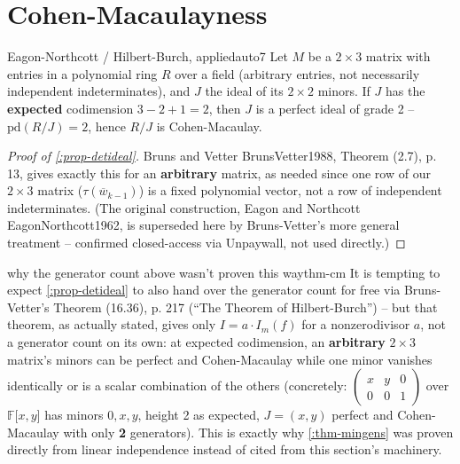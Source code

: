 \documentclass[a4paper,11pt]{scrartcl}
\begin{document}
\section{Cohen-Macaulayness}

\begin{proposition}{Eagon-Northcott / Hilbert-Burch, applied}{auto7} Let \(M\) be a \(2 \times 3\) matrix with entries in a polynomial ring \(R\) over a field (arbitrary entries, not necessarily independent indeterminates), and \(J\) the ideal of its \(2 \times 2\) minors. If \(J\) has the \textbf{expected} codimension \(3 - 2 + 1 = 2\), then \(J\) is a perfect ideal of grade 2 -- \(\text{pd}(R/J) = 2\), hence \(R/J\) is Cohen-Macaulay.

\end{proposition} \protect{}\label{prop-detideal}{}

\begin{proof}[Proof of \cref{:prop-detideal}] Bruns and Vetter BrunsVetter1988, Theorem (2.7), p. 13, gives exactly this for an \textbf{arbitrary} matrix, as needed since one row of our \(2 \times 3\) matrix (\(\tau({\overline{w}}_{k - 1})\)) is a fixed polynomial vector, not a row of independent indeterminates. (The original construction, Eagon and Northcott EagonNorthcott1962, is superseded here by Bruns-Vetter's more general treatment -- confirmed closed-access via Unpaywall, not used directly.)

\end{proof}

\begin{remark}{why the generator count above wasn't proven this way}{thm-cm} It is tempting to expect \cref{:prop-detideal} to also hand over the generator count for free via Bruns-Vetter's Theorem (16.36), p. 217 (``The Theorem of Hilbert-Burch'') -- but that theorem, as actually stated, gives only \(I = a \cdot I_{m}(f)\) for a nonzerodivisor \(a\), not a generator count on its own: at expected codimension, an \textbf{arbitrary} \(2 \times 3\) matrix's minors can be perfect and Cohen-Macaulay while one minor vanishes identically or is a scalar combination of the others (concretely: \(\begin{pmatrix}
x & y & 0 \\
0 & 0 & 1
\end{pmatrix}\) over \(\mathbb{F}\lbrack x,y\rbrack\) has minors \(0,x,y\), height 2 as expected, \(J = (x,y)\) perfect and Cohen-Macaulay with only \textbf{2} generators). This is exactly why \cref{:thm-mingens} was proven directly from linear independence instead of cited from this section's machinery.

\end{remark}
\end{document}
